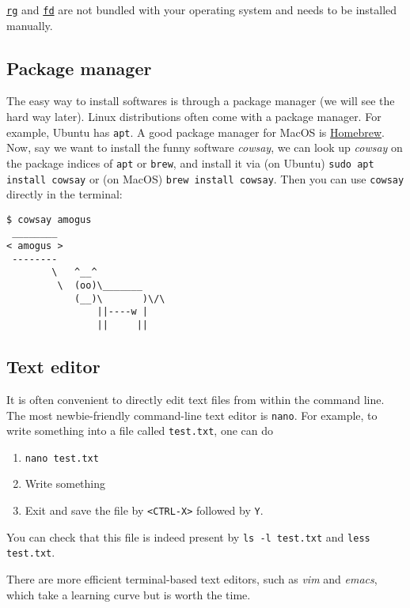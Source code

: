 \documentclass[12pt,letterpaper]{article}
\begin{document}
\href{https://github.com/BurntSushi/ripgrep}{\texttt{rg}} and \href{https://github.com/sharkdp/fd}{\texttt{fd}} are not bundled with your operating system and needs to be installed manually.

\subsection{Package manager} \label{sec:package-manager}

The easy way to install softwares is through a package manager (we will see the hard way later). Linux distributions often come with a package manager. For example, Ubuntu has \texttt{apt}. A good package manager for MacOS is \href{https://brew.sh/}{Homebrew}. Now, say we want to install the funny software \textit{cowsay}, we can look up \textit{cowsay} on the package indices of \texttt{apt} or \texttt{brew}, and install it via (on Ubuntu) \texttt{sudo apt install cowsay} or (on MacOS) \texttt{brew install cowsay}. Then you can use \texttt{cowsay} directly in the terminal:

\begin{verbatim}
$ cowsay amogus
 ________
< amogus >
 --------
        \   ^__^
         \  (oo)\_______
            (__)\       )\/\
                ||----w |
                ||     ||
\end{verbatim}

\subsection{Text editor}

It is often convenient to directly edit text files from within the command line. The most newbie-friendly command-line text editor is \texttt{nano}. For example, to write something into a file called \texttt{test.txt}, one can do

\begin{enumerate}
   \item \texttt{nano test.txt}
   \item Write something
   \item Exit and save the file by \texttt{<CTRL-X>} followed by \texttt{Y}.
\end{enumerate}

You can check that this file is indeed present by \texttt{ls -l test.txt} and \texttt{less test.txt}.

There are more efficient terminal-based text editors, such as \textit{vim} and \textit{emacs}, which take a learning curve but is worth the time.
\end{document}
